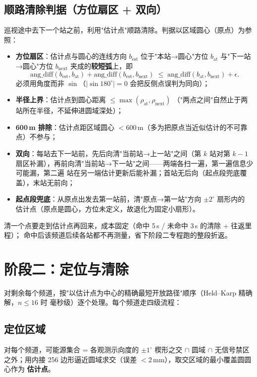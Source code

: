 \documentclass[a4paper,11pt]{ctexart}
\begin{document}
\subsection{顺路清除判据（方位扇区 + 双向）}
巡视途中去下一个站之前，利用"估计点"顺路清除。判据以区域圆心（原点）为参照：
\begin{itemize}
  \item \textbf{方位扇区}：估计点与圆心的连线方向 $b_{\text{est}}$ 位于"本站→圆心"方位
        $b_{\text{at}}$ 与"下一站→圆心"方位 $b_{\text{next}}$ 夹成的\textbf{较短弧}上，即
        \begin{equation}
          \mathrm{ang\_diff}(b_{\text{est}},b_{\text{at}})+\mathrm{ang\_diff}
          (b_{\text{est}},b_{\text{next}}) \;\le\;
          \mathrm{ang\_diff}(b_{\text{at}},b_{\text{next}})+\epsilon .
          \label{eq:arc}
        \end{equation}
        必须用角度而非 $\sin$（$|\sin 180^\circ|=0$ 会把反侧点误判为同向）；
  \item \textbf{半径上界}：估计点到圆心距离 $\le \max(\rho_{\text{at}},\rho_{\text{next}})$
        （"两点之间"自然止于两站所在半径，不延伸进圆域深处）；
  \item \textbf{600\,m 排除}：估计点距区域圆心 $<600$\,m（多为把原点当近似估计的不可靠点）不参与；
  \item \textbf{双向}：每站去下一站前，先后向清"当前站→上一站"之间（第 $k$ 站对第 $k-1$
        扇区补漏），再前向清"当前站→下一站"之间——两端各扫一遍，第一遍信息少可能漏，第二遍
        站在另一端估计更新后能补漏；首站无后向（起点段兜底覆盖），末站无前向；
  \item \textbf{起点段兜底}：从原点出发去第一站前，清"原点→第一站"方向 $\pm2^\circ$ 扇形内的
        估计点（原点是圆心，方位未定义，故退化为固定小扇形）。
\end{itemize}
清一个点要走到估计点再回来，成本固定（命中 5\,s / 未命中 3\,s 的清除 + 往返里程）；
命中后该频道后续各站都不再测量，省下阶段二专程跑的整段折返。

\section{阶段二：定位与清除}
对剩余每个频道，按"以估计点为中心的精确最短开放路径"顺序（Held--Karp 精确解，$n\le16$ 时
毫秒级）逐个处理。每个频道走四级流程：

\subsection{定位区域}
对每个频道，可能源集合 = 各观测示向度的 ${\pm1^\circ}$ 楔形之交 $\cap$ 圆域 $\cap$
无信号禁区之外；用内接 256 边形逼近圆域求交（误差 $<2$\,mm），取交区域的最小覆盖圆圆心作为
\textbf{估计点}。
\end{document}
